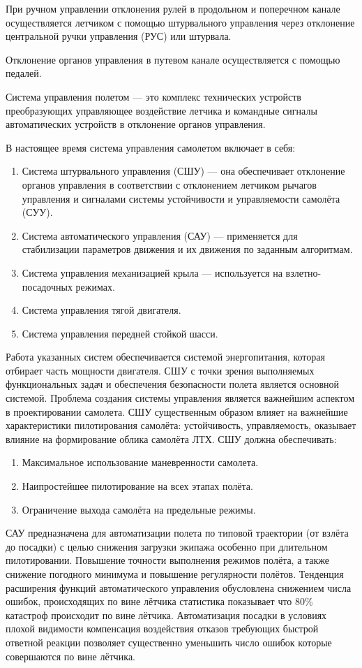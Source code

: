 \documentclass{article}
\begin{document}
При ручном управлении отклонения рулей в продольном и поперечном канале
осуществляется летчиком с помощью штурвального управления через отклонение
центральной ручки управления (РУС) или штурвала.

Отклонение органов управления в путевом канале осуществляется с помощью
педалей.

Система управления полетом --- это комплекс технических устройств преобразующих
управляющее воздействие летчика и командные сигналы автоматических устройств в
отклонение органов управления.

В настоящее время система управления самолетом включает в себя:
\begin{enumerate}
	\item Система штурвального управления (СШУ) --- она обеспечивает отклонение
	      органов управления в соответствии с отклонением летчиком рычагов
	      управления и сигналами системы устойчивости и управляемости самолёта
	      (СУУ).
	\item Система автоматического управления (САУ) --- применяется для
	      стабилизации параметров движения и их движения по заданным алгоритмам.
	\item Система управления механизацией крыла --- используется на
	      взлетно-посадочных режимах.
	\item Система управления тягой двигателя.
	\item Система управления передней стойкой шасси.
\end{enumerate}

Работа указанных систем обеспечивается системой энергопитания, которая отбирает
часть мощности двигателя. СШУ с точки зрения выполняемых функциональных задач и
обеспечения безопасности полета является основной системой. Проблема создания
системы управления является важнейшим аспектом в проектировании самолета. СШУ
существенным образом влияет на важнейшие характеристики пилотирования самолёта:
устойчивость, управляемость, оказывает влияние на формирование облика самолёта
ЛТХ. СШУ должна обеспечивать:
\begin{enumerate}
	\item Максимальное использование маневренности самолета.
	\item Наипростейшее пилотирование на всех этапах полёта.
	\item Ограничение выхода самолёта на предельные режимы.
\end{enumerate}

САУ предназначена для автоматизации полета по типовой траектории (от взлёта до
посадки) с целью снижения загрузки экипажа особенно при длительном
пилотировании. Повышение точности выполнения режимов полёта, а также снижение
погодного минимума и повышение регулярности полётов. Тенденция расширения
функций автоматического управления обусловлена снижением числа ошибок,
происходящих по вине лётчика статистика показывает что 80\% катастроф
происходит по вине лётчика. Автоматизация посадки в условиях плохой видимости
компенсация воздействия отказов требующих быстрой ответной реакции позволяет
существенно уменьшить число ошибок которые совершаются по вине лётчика.
\end{document}
